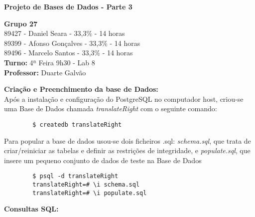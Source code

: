 \documentclass[12pt]{report}
\begin{document}
    \begin{titlepage}
        \begin{center}

            \vspace*{\fill}
            \Huge
            \textbf{Projeto de Bases de Dados - Parte 3}
            
            \vspace*{\fill}

            \Large
            \textbf{Grupo 27} \\
            89427 - Daniel Seara - 33,3\% - 14 horas \\
            89399 - Afonso Gonçalves - 33,3\% - 14 horas \\
            89496 - Marcelo Santos - 33,3\% - 14 horas \\

            \bigskip
            \textbf{Turno:} 4ª Feira 9h30 - Lab 8\\ \textbf{Professor:} Duarte Galvão
        
        \end{center}
    \end{titlepage}

    \Large
    \textbf{Criação e Preenchimento da base de Dados:}\\
    
    \normalsize
    \vspace{2mm}
    Após a instalação e configuração do PostgreSQL no computador host, criou-se uma Base de Dados chamada \textit{translateRight} com o seguinte comando:
    \begin{verbatim}
        $ createdb translateRight
    \end{verbatim}
    
    Para popular a base de dados usou-se dois ficheiros .sql: \textit{schema.sql}, que trata de criar/reiniciar as tabelas e definir as restrições de integridade, e \textit{populate.sql}, que insere um pequeno conjunto de dados de teste na Base de Dados
    \begin{verbatim}
        $ psql -d translateRight
        translateRight=# \i schema.sql
        translateRight=# \i populate.sql
    \end{verbatim}

    \Large 
    \textbf{Consultas SQL:}

    \normalsize
    \vspace{2mm}
\end{document}
